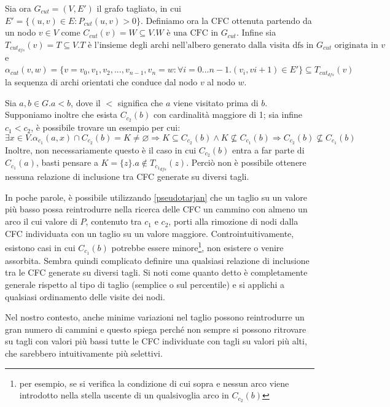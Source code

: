 \documentclass[10pt,a4paper]{article}
\begin{document}
Sia ora $G_{cut}=(V,E')$ il grafo tagliato, in cui $E' = \{(u,v) \in E : P_{cut}(u,v) > 0\}$. Definiamo ora la CFC ottenuta partendo da un nodo $v \in V$ come $C_{cut}( v ) = W \subseteq V. W \text{ è una CFC in } G_{cut} $. Infine sia $ T_{cut_{dfs}}(v) = T \subseteq V . T \text{ è l'insieme degli archi nell'albero generato dalla visita dfs in } G_{cut} \text{ originata in } v $ e $\alpha_{cut} (v, w) = \{ v = v_{0}, v_{1}, v_{2}, ... , v_{n-1}, v_{n} = w : \forall i = 0...n-1 . (v_{i}, v{i+1}) \in E' \}  \subseteq T_{cut_{dfs}}( v )$ la sequenza di archi orientati che conduce dal nodo $v$ al nodo $w$.

Sia $a,b \in G . a < b$, dove il $<$ significa che $a$ viene visitato prima di $b$. Supponiamo inoltre che esista $C_{c_{2}}( b )$ con cardinalità maggiore di 1; sia infine $c_{1} < c_{2}$, è possibile trovare un esempio per cui: 
$$
\exists x \in V . \alpha_{c_{1}}(a, x) \cap C_{c_{2}}( b ) = K \neq \varnothing \Rightarrow K \subseteq C_{c_{2}}( b ) \land K \nsubseteq C_{c_{1}}( b ) \Rightarrow C_{c_{2}}( b ) \nsubseteq C_{c_{1}}( b )
$$
Inoltre, non necessariamente questo è il caso in cui $C_{c_{2}}( b )$ entra a far parte di $C_{c_{1}}( a )$, basti pensare a $K = \{z\} . a \notin T_{{c_{1}}_{dfs}} ( z ) $. Perciò non è possibile ottenere nessuna relazione di inclusione tra CFC generate su diversi tagli.

In poche parole, è possibile utilizzando \ref{pseudotarjan} che un taglio su un valore più basso possa reintrodurre nella ricerca delle CFC un cammino con almeno un arco il cui valore di $P$, contenuto tra $c_{1}$ e $c_{2}$, porti alla rimozione di nodi dalla CFC individuata con un taglio su un valore maggiore. Controintuitivamente, esistono casi in cui $C_{c_{1}}( b )$ potrebbe essere minore\footnote{ per esempio, se si verifica la condizione di cui sopra e nessun arco viene introdotto nella stella uscente di un qualsivoglia arco in $C_{c_2}( b ) $}, non esistere o venire assorbita. Sembra quindi complicato definire una qualsiasi relazione di inclusione tra le CFC generate su diversi tagli.
Si noti come quanto detto è completamente generale rispetto al tipo di taglio (semplice o sul percentile) e si applichi a qualsiasi ordinamento delle visite dei nodi.

Nel nostro contesto, anche minime variazioni nel taglio possono reintrodurre un gran numero di cammini e questo spiega perché non sempre si possono ritrovare su tagli con valori più bassi tutte le CFC individuate con tagli su valori più alti, che sarebbero intuitivamente più selettivi.
\end{document}

